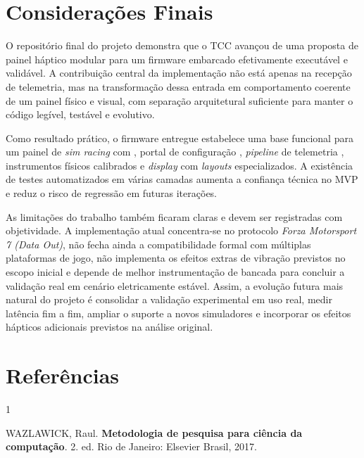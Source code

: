 \documentclass[12pt,oneside,a4paper]{article}
\renewcommand{\texttt}[1]{\begingroup\ttfamily\seqsplit{#1}\endgroup}
\begin{document}
\section{Considerações Finais}

O repositório final do projeto demonstra que o TCC avançou de uma proposta de
painel háptico modular para um firmware embarcado efetivamente executável e
validável. A contribuição central da implementação não está apenas na recepção
de telemetria, mas na transformação dessa entrada em comportamento coerente de
um painel físico e visual, com separação arquitetural suficiente para manter o
código legível, testável e evolutivo.

Como resultado prático, o firmware entregue estabelece uma base funcional para
um painel de \textit{sim racing} com \texttt{ESP32}, portal de configuração
\texttt{Wi-Fi}, \textit{pipeline} de telemetria \texttt{UDP}, instrumentos físicos
calibrados e \textit{display} com \textit{layouts} especializados. A existência de testes
automatizados em várias camadas aumenta a confiança técnica no MVP e reduz o
risco de regressão em futuras iterações.

As limitações do trabalho também ficaram claras e devem ser registradas com
objetividade. A implementação atual concentra-se no protocolo
\textit{Forza Motorsport 7 (Data Out)}, não fecha ainda a compatibilidade
formal com múltiplas plataformas de jogo, não implementa os efeitos extras de
vibração previstos no escopo inicial e depende de melhor instrumentação de
bancada para concluir a validação \texttt{UDP} real em cenário eletricamente
estável. Assim, a evolução futura mais natural do projeto é consolidar a
validação experimental em uso real, medir latência fim a fim, ampliar o suporte
a novos simuladores e incorporar os efeitos hápticos adicionais previstos na
análise original.

\newpage
\renewcommand{\refname}{}
\section*{Referências}
\begin{thebibliography}{1}

WAZLAWICK, Raul.
\textbf{Metodologia de pesquisa para ciência da computação}.
2. ed.
Rio de Janeiro: Elsevier Brasil, 2017.

\end{thebibliography}

\clearpage
\appendix
\end{document}
